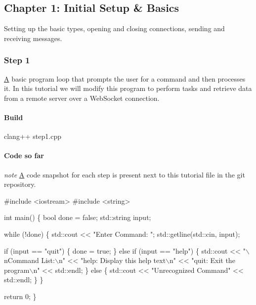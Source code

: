 \subsection*{Chapter 1\+: Initial Setup \& Basics }

Setting up the basic types, opening and closing connections, sending and receiving messages.

\subsubsection*{Step 1}

\mbox{\hyperlink{struct_a}{A}} basic program loop that prompts the user for a command and then processes it. In this tutorial we will modify this program to perform tasks and retrieve data from a remote server over a Web\+Socket connection.

\paragraph*{Build}

{\ttfamily clang++ step1.\+cpp}

\paragraph*{Code so far}

{\itshape note} \mbox{\hyperlink{struct_a}{A}} code snapshot for each step is present next to this tutorial file in the git repository.


\begin{DoxyCode}
\textcolor{preprocessor}{#include <iostream>}
\textcolor{preprocessor}{#include <string>}

\textcolor{keywordtype}{int} main() \{
    \textcolor{keywordtype}{bool} done = \textcolor{keyword}{false};
    std::string input;

    \textcolor{keywordflow}{while} (!done) \{
        std::cout << \textcolor{stringliteral}{"Enter Command: "};
        std::getline(std::cin, input);

        \textcolor{keywordflow}{if} (input == \textcolor{stringliteral}{"quit"}) \{
            done = \textcolor{keyword}{true};
        \} \textcolor{keywordflow}{else} \textcolor{keywordflow}{if} (input == \textcolor{stringliteral}{"help"}) \{
            std::cout
                << \textcolor{stringliteral}{"\(\backslash\)nCommand List:\(\backslash\)n"}
                << \textcolor{stringliteral}{"help: Display this help text\(\backslash\)n"}
                << \textcolor{stringliteral}{"quit: Exit the program\(\backslash\)n"}
                << std::endl;
        \} \textcolor{keywordflow}{else} \{
            std::cout << \textcolor{stringliteral}{"Unrecognized Command"} << std::endl;
        \}
    \}

    \textcolor{keywordflow}{return} 0;
\}
\end{DoxyCode}


